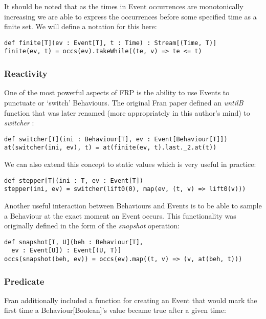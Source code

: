      It should be noted that as the times in Event occurrences are monotonically increasing
      we are able to express the occurrences before some specified time as a finite set. We will
      define a notation for this here:

\begin{verbatim}
def finite[T](ev : Event[T], t : Time) : Stream[(Time, T)]
finite(ev, t) = occs(ev).takeWhile((te, v) => te <= t)
\end{verbatim}
        
      \subsubsection{Reactivity}
        One of the most powerful aspects of FRP is the ability to use Events to punctuate or `switch' Behaviours.
        The original Fran paper defined an \emph{untilB} function that was later renamed (more appropriately in this
        author's mind) to \emph{switcher} \cite{Elliott2009}:

\begin{verbatim}
def switcher[T](ini : Behaviour[T], ev : Event[Behaviour[T]])
at(switcher(ini, ev), t) = at(finite(ev, t).last._2.at(t))
\end{verbatim}

        We can also extend this concept to static values which is very useful in practice:
      
\begin{verbatim}  
def stepper[T](ini : T, ev : Event[T])
stepper(ini, ev) = switcher(lift0(0), map(ev, (t, v) => lift0(v)))    
\end{verbatim}

        Another useful interaction between Behaviours and Events is to be able to sample
        a Behaviour at the exact moment an Event occurs. This functionality was originally defined in the
        form of the \emph{snapshot} operation:

\begin{verbatim}
def snapshot[T, U](beh : Behaviour[T], 
  ev : Event[U]) : Event[(U, T)]
occs(snapshot(beh, ev)) = occs(ev).map((t, v) => (v, at(beh, t)))
\end{verbatim} 

    \subsubsection{Predicate}
      Fran additionally included a function for creating an Event that would mark the first
      time a Behaviour[Boolean]'s value became true after a given time:
      
